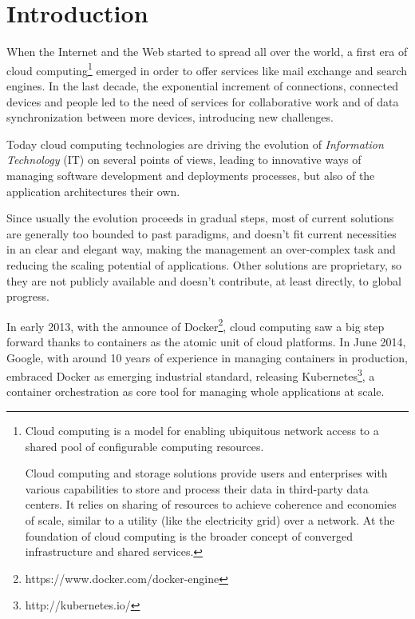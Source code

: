 \chapter{Introduction}\label{introduction}

When the Internet and the Web started to spread all over the world, a first era of cloud computing\footnote{Cloud computing is a model for enabling ubiquitous network access to a shared pool of configurable computing resources.

Cloud computing and storage solutions provide users and enterprises with various capabilities to store and process their data in third-party data centers. It relies on sharing of resources to achieve coherence and economies of scale, similar to a utility (like the electricity grid) over a network. At the foundation of cloud computing is the broader concept of converged infrastructure and shared services.\cite{CloudComputing}
} emerged in order to offer services like mail exchange and search engines.  In the last decade,  the exponential increment of connections, connected devices and people led to the need of services for collaborative work and of data synchronization between more devices, introducing new challenges.

Today cloud computing technologies are driving the evolution of \textit{Information Technology} (IT) on several points of views, leading to innovative ways of managing software development and deployments processes, but also of the application architectures their own.

Since usually the evolution proceeds in gradual steps, most of current solutions are generally too bounded to past paradigms, and doesn't fit current necessities in an clear and elegant way, making the management an over-complex task and reducing the scaling potential of applications.  Other solutions are proprietary, so they are not publicly available and doesn't contribute, at least directly, to global progress.

In early 2013, with the announce of Docker\footnote{https://www.docker.com/docker-engine}, cloud computing saw a big step forward thanks to containers as the atomic unit of cloud platforms.  In June 2014, Google, with around 10 years of experience in managing containers in production, embraced Docker as emerging industrial standard, releasing Kubernetes\footnote{http://kubernetes.io/}, a container orchestration as core tool for managing whole applications at scale.


